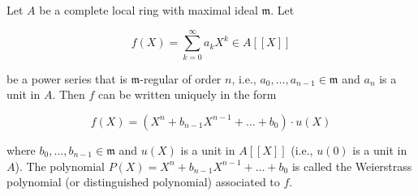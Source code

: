 Let $A$ be a complete local ring with maximal ideal $\mathfrak{m}$. Let

$$f(X) = \sum_{k=0}^{\infty} a_k X^k \in A[[X]]$$

be a power series that is $\mathfrak{m}$-regular of order $n$, i.e., $a_0, \dots, a_{n-1} \in \mathfrak{m}$ and $a_n$ is a unit in $A$. Then $f$ can be written uniquely in the form

$$f(X) = (X^n + b_{n-1} X^{n-1} + \dots + b_0) \cdot u(X)$$

where $b_0, \dots, b_{n-1} \in \mathfrak{m}$ and $u(X)$ is a unit in $A[[X]]$ (i.e., $u(0)$ is a unit in $A$). The polynomial $P(X) = X^n + b_{n-1} X^{n-1} + \dots + b_0$ is called the Weierstrass polynomial (or distinguished polynomial) associated to $f$.
